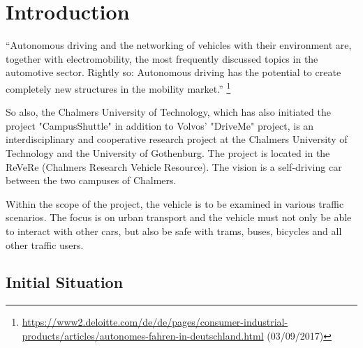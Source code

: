 \chapter{Introduction}
``Autonomous driving and the networking of vehicles with their environment are, together with electromobility, the most frequently discussed topics in the automotive sector.
Rightly so: Autonomous driving has the potential to create completely new structures in the mobility market.''
\footnote{\url{https://www2.deloitte.com/de/de/pages/consumer-industrial-products/articles/autonomes-fahren-in-deutschland.html} (03/09/2017)}

So also, the Chalmers University of Technology, which has also initiated the project "CampusShuttle" in addition to Volvos' "DriveMe" project, 
is an interdisciplinary and cooperative research project at the Chalmers University of Technology and the University of Gothenburg.
The project is located in the ReVeRe (Chalmers Research Vehicle Resource). The vision is a self-driving car between the two campuses of Chalmers.

Within the scope of the project, the vehicle is to be examined in various traffic scenarios. The focus is on urban transport and the vehicle must not only be able to interact with other cars, 
but also be safe with trams, buses, bicycles and all other traffic users.

\section{Initial Situation}


